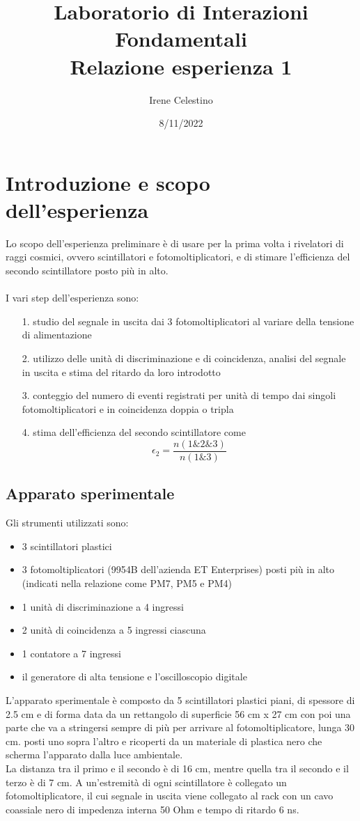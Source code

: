 \documentclass{article}
\title{Laboratorio di Interazioni Fondamentali \\ Relazione esperienza 1}
\author{Irene Celestino}
\date{8/11/2022}
\begin{document}
\maketitle

\section{Introduzione e scopo dell'esperienza}
Lo scopo dell'esperienza preliminare è di usare per la prima volta i rivelatori di raggi cosmici, ovvero scintillatori e fotomoltiplicatori, e di stimare l'efficienza del secondo scintillatore posto più in alto. 
\\
\\
I vari step dell'esperienza sono: 
\begin{itemize}
    \item [1.] studio del segnale in uscita dai 3 fotomoltiplicatori al variare della tensione di alimentazione
    \item [2.] utilizzo delle unità di discriminazione e di coincidenza, analisi del segnale in uscita e stima del ritardo da loro introdotto 
    \item [3.] conteggio del numero di eventi registrati per unità di tempo dai singoli fotomoltiplicatori e in coincidenza doppia o tripla
    \item [4.] stima dell'efficienza del secondo scintillatore come $$\epsilon_2 = \frac{n(1\&2\&3)}{n(1\&3)}$$
\end{itemize}

\subsection{Apparato sperimentale}
Gli strumenti utilizzati sono: 
\begin{itemize}
    \item 3 scintillatori plastici 
    \item 3 fotomoltiplicatori (9954B dell'azienda ET Enterprises) posti più in alto (indicati nella relazione come PM7, PM5 e PM4) 
    \item 1 unità di discriminazione a 4 ingressi
    \item 2 unità di coincidenza a 5 ingressi ciascuna
    \item 1 contatore a 7 ingressi 
    \item il generatore di alta tensione e l'oscilloscopio digitale
\end{itemize}
L'apparato sperimentale è composto da 5 scintillatori plastici piani, di spessore di 2.5 cm e di forma data da un rettangolo di superficie 56 cm x 27 cm con poi una parte che va a stringersi sempre di più per arrivare al fotomoltiplicatore, lunga 30 cm.
posti uno sopra l'altro e ricoperti da un materiale di plastica nero che scherma l'apparato dalla luce ambientale. \\
La distanza tra il primo e il secondo è di 16 cm, mentre quella tra il secondo e il terzo è di 7 cm. 
A un'estremità di ogni scintillatore è collegato un fotomoltiplicatore, il cui segnale in uscita viene collegato al rack con un cavo coassiale nero di impedenza interna 50 Ohm e tempo di ritardo 6 ns.\\
\end{document}
